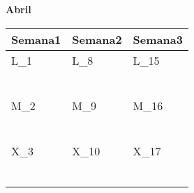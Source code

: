 \clearpage
{\raggedleft
	\fontsize{25}{50}\selectfont
	\textbf{Abril}\\
}


	\renewcommand{\arraystretch}{1.24}\scriptsize
	\begin{longtabu} to \textwidth { X[l] X[l] X[l]}
		\centering \textbf{Semana1} &  \centering\textbf{Semana2}  &   \centering\textbf{Semana3}  \\
		\toprule
		L_{1} & L_{8} & L_{15} \\
		\makebox{$\square$}\dotfill & \makebox{$\square$}\dotfill & \makebox{$\square$}\dotfill \\
		\dotfill & \dotfill & \dotfill \\
		\makebox{$\square$}\dotfill & \makebox{$\square$}\dotfill & \makebox{$\square$}\dotfill \\
		\dotfill & \dotfill & \dotfill \\
		\makebox{$\square$}\dotfill & \makebox{$\square$}\dotfill & \makebox{$\square$}\dotfill \\
		\dotfill & \dotfill & \dotfill \\

		\hline

		M_{2} & M_{9} & M_{16} \\
		\makebox{$\square$}\dotfill & \makebox{$\square$}\dotfill & \makebox{$\square$}\dotfill \\
		\dotfill & \dotfill & \dotfill \\
		\makebox{$\square$}\dotfill & \makebox{$\square$}\dotfill & \makebox{$\square$}\dotfill \\
		\dotfill & \dotfill & \dotfill \\
		\makebox{$\square$}\dotfill & \makebox{$\square$}\dotfill & \makebox{$\square$}\dotfill \\
		\dotfill & \dotfill & \dotfill \\

		\hline

		X_{3} & X_{10} & X_{17} \\
		\makebox{$\square$}\dotfill & \makebox{$\square$}\dotfill & \makebox{$\square$}\dotfill \\
		\dotfill & \dotfill & \dotfill \\
		\makebox{$\square$}\dotfill & \makebox{$\square$}\dotfill & \makebox{$\square$}\dotfill \\
		\dotfill & \dotfill & \dotfill \\
		\makebox{$\square$}\dotfill & \makebox{$\square$}\dotfill & \makebox{$\square$}\dotfill \\
		\dotfill & \dotfill & \dotfill \\


\end{longtabu}
